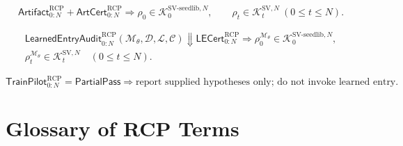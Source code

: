 \documentclass[11pt]{article}
\newcommand{\1}{\mathbf{1}}
\newcommand{\RCP}{\mathrm{RCP}}
\providecommand{\Kcal}{\mathcal{K}}
\begin{document}
\[
\mathsf{Artifact}_{0:N}^{\RCP}+\mathsf{ArtCert}_{0:N}^{\RCP}
\Longrightarrow
\rho_0\in\Kcal_0^{\mathrm{SV\mbox{-}seedlib},N},
\qquad
\rho_t\in\Kcal_t^{\mathrm{SV},N}\ (0\le t\le N).
\]



\[
\begin{gathered}
\mathsf{LearnedEntryAudit}_{0:N}^{\RCP}
(\mathcal M_\theta,\mathcal D,\mathcal L,\mathcal C)
\Downarrow
\mathsf{LECert}_{0:N}^{\RCP}
\Longrightarrow
\rho_0^{\mathcal M_\theta}\in\Kcal_0^{\mathrm{SV\mbox{-}seedlib},N},\\
\rho_t^{\mathcal M_\theta}\in\Kcal_t^{\mathrm{SV},N}
\quad(0\le t\le N).
\end{gathered}
\]

\[
\mathsf{TrainPilot}_{0:N}^{\RCP}=\mathsf{PartialPass}
\Longrightarrow
\text{report supplied hypotheses only; do not invoke learned entry.}
\]

\section{Glossary of RCP Terms}
\end{document}
